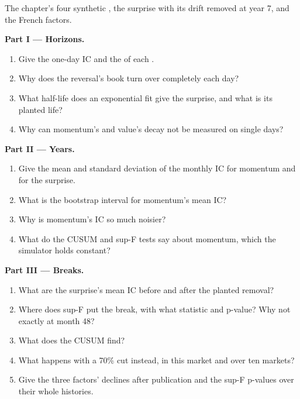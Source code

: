 \begin{problem}\label{pb:rs:half-life-decay-and-stability:1}
The chapter's four synthetic , the surprise with its drift removed at year 7, and the French factors.

\medskip\noindent\textbf{Part I --- Horizons.}
\begin{enumerate}
\item Give the one-day IC and the  of each .
\item Why does the reversal's book turn over completely each day?
\item What half-life does an exponential fit give the surprise, and what is its planted life?
\item Why can momentum's and value's decay not be measured on single days?
\end{enumerate}

\medskip\noindent\textbf{Part II --- Years.}
\begin{enumerate}[resume]
\item Give the mean and standard deviation of the monthly IC for momentum and for the surprise.
\item What is the bootstrap interval for momentum's mean IC?
\item Why is momentum's IC so much noisier?
\item What do the CUSUM and sup-F tests say about momentum, which the simulator holds constant?
\end{enumerate}

\medskip\noindent\textbf{Part III --- Breaks.}
\begin{enumerate}[resume]
\item What are the surprise's mean IC before and after the planted removal?
\item Where does sup-F put the break, with what statistic and p-value? Why not exactly at month 48?
\item What does the CUSUM find?
\item What happens with a 70\% cut instead, in this market and over ten markets?
\item Give the three factors' declines after publication and the sup-F p-values over their whole histories.
\end{enumerate}


\end{problem}
